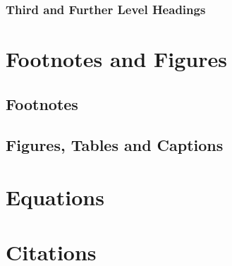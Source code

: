 \documentclass{article}
\begin{document}
\subsubsection{Third and Further Level Headings}


\section{Footnotes and Figures}

\subsection{Footnotes}

\subsection{Figures, Tables and Captions}


\section{Equations}

\section{Citations}



\end{document}
